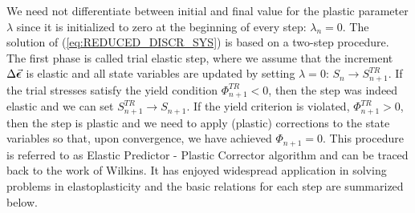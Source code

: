 We need not differentiate between initial and final value for the plastic
parameter $\lambda$ since it is initialized to zero at the beginning of every
step: $\lambda_n = 0$. The solution of (\ref{eq:REDUCED_DISCR_SYS}) is based on
a two-step procedure. The first phase is called trial elastic step, where 
we assume that the increment $\Delta\vec{\bm{\epsilon}}$ is elastic and all state 
variables are updated by setting $\lambda=0$: $S_n\rightarrow S_{n+1}^{TR}$. If 
the trial stresses satisfy the yield condition $\Phi^{TR}_{n+1} < 0$, then the 
step
was indeed elastic and we can set $S^{TR}_{n+1}\rightarrow S_{n+1}$. If the 
yield 
criterion is violated, $\Phi^{TR}_{n+1}>0$, then the step is plastic and we 
need to 
apply (plastic) corrections to the state variables so that, upon convergence, 
we have achieved $\Phi_{n+1} = 0$. This procedure is referred to as
Elastic Predictor - Plastic Corrector algorithm and can be traced back to the
work of Wilkins\cite{Wilkins1963}. It has enjoyed widespread
application in solving problems in
elastoplasticity\cite{Dodds1987,DeAngelis2015,Clausen2006,Hopperstad1995,Scherzinger2017,Hartloper2021}
and the basic relations for each step are summarized below.

